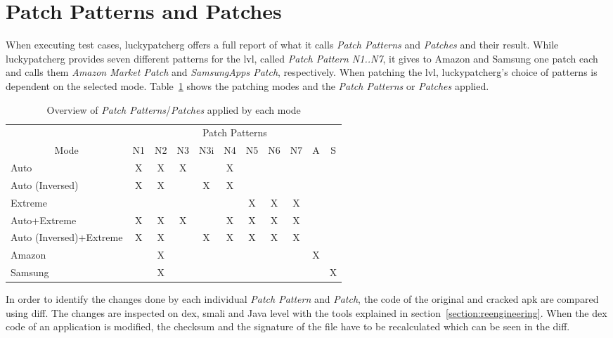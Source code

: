 \section{Patch Patterns and Patches} \label{section:luckypatcher-patterns}
When executing test cases, \gls{luckypatcherg} offers a full report of what it calls \textit{Patch Patterns} and \textit{Patches} and their result.
While \gls{luckypatcherg} provides seven different patterns for the \gls{lvl}, called \textit{Patch Pattern N1..N7}, it gives to Amazon and Samsung one patch each and calls them \textit{Amazon Market Patch} and \textit{SamsungApps Patch}, respectively.
\newline
When patching the \gls{lvl}, \gls{luckypatcherg}'s choice of patterns is dependent on the selected mode.
Table~\ref{table:patterns} shows the patching modes and the \textit{Patch Patterns} or \textit{Patches} applied.
\newline
\begin{table}[h]
\centering
\begin{tabular}{l|cccccccccc}
              & \multicolumn{10}{c}{Patch Patterns}      \\
\multicolumn{1}{c|}{Mode} & N1 & N2 & N3 & N3i & N4 & N5 & N6 & N7 & A & S \\ \hline
Auto            & X & X & X &   & X &  &  & && \\
Auto (Inversed)      & X & X &   & X  & X &  &  & && \\
Extreme          &  &  &  &   &  & X & X & X && \\
Auto+Extreme        & X & X & X &   & X & X & X & X && \\
Auto (Inversed)+Extreme  & X & X &  & X  & X & X & X &X &&\\
Amazon        &  & X&  &   &  &  &  & & X &\\
Samsung        &  &  X&  &   &  &  &  &  & & X
\end{tabular}
\caption{Overview of \textit{Patch Patterns}/\textit{Patches} applied by each mode}
\label{table:patterns}
\end{table}
In order to identify the changes done by each individual \textit{Patch Pattern} and \textit{Patch}, the code of the original and cracked \gls{apk} are compared using diff.
The changes are inspected on dex, smali and Java level with the tools explained in section~\ref{section:reengineering}.
\newline
When the dex code of an application is modified, the checksum and the signature of the file have to be recalculated which can be seen in the diff.
